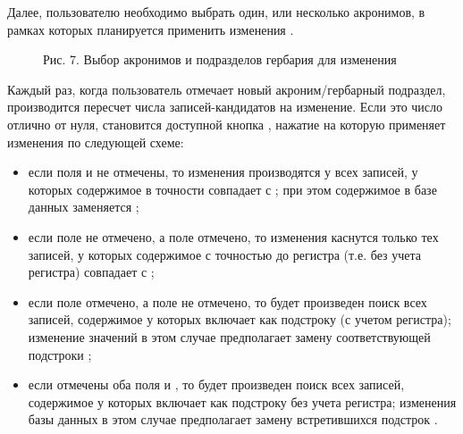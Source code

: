 \documentclass[letterpaper,10pt,russian]{sphinxmanual}
\begin{document}
Далее, пользователю необходимо выбрать один, или несколько акронимов,
в рамках которых планируется применить изменения {\hyperref[\detokenize{main:main-pic7}]{}}.

\begin{figure}[htbp]
\centering
\capstart

\noindent{}
\caption{Рис. 7. Выбор акронимов и подразделов гербария для изменения}\label{\detokenize{main:main-pic7}}\label{\detokenize{main:id70}}\end{figure}

Каждый раз, когда пользователь отмечает новый акроним/гербарный подраздел,
производится пересчет числа записей-кандидатов на изменение. Если это число отлично от нуля,
становится доступной кнопка , нажатие на которую применяет
изменения по следующей схеме:
\begin{itemize}
\item {} 
если поля  и  не отмечены, то
изменения производятся у всех записей, у которых содержимое 
в точности совпадает с ; при этом  содержимое 
в базе данных заменяется ;

\item {} 
если поле  не отмечено, а поле
 отмечено, то изменения каснутся только тех записей,
у которых содержимое  с точностью до регистра (т.е. без учета регистра)
совпадает с ;

\item {} 
если поле  отмечено,
а поле  не отмечено, то будет произведен поиск всех записей,
содержимое  у которых включает  как подстроку (с учетом регистра);
изменение значений в этом случае предполагает замену соответствующей подстроки ;

\item {} 
если отмечены оба поля  и ,
то будет произведен поиск всех записей, содержимое  у которых включает 
как подстроку без учета регистра; изменения базы данных в этом случае предполагает
замену встретившихся подстрок .

\end{itemize}
\end{document}
